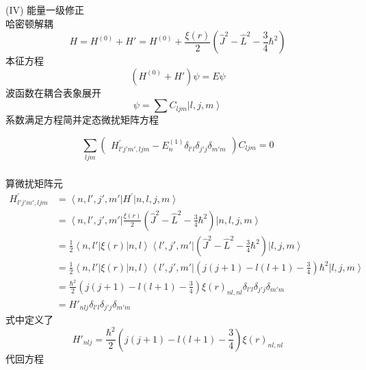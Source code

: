 \begin{frame}[label=current]
  \frametitle{}
  (IV) 能量一级修正 \\
  哈密顿解耦
  $$
  H= H^{(0)} + H' = H^{(0)} + \frac{\xi(r)}{2} (\hat{J}^2 - \hat{L}^2 - \frac{3}{4}\hbar^2)  
  $$ 
  本征方程 
  $$
  (H^{(0)} + H')\psi = E \psi  
  $$ 
  波函数在耦合表象展开
$$
\psi = \sum C_{ljm}\left\vert l, j, m \right \rangle
$$ 
系数满足方程简并定态微扰矩阵方程

  \begin{equation*}
    \sum_{ljm}\begin{pmatrix}H^{\prime}_{l'j'm',ljm} -E^{(1)}_n \delta _{l'l} \delta _{j'j}\delta _{m'm} \end{pmatrix}C_{ljm} =0
  \end{equation*}
\end{frame} 

\begin{frame}[label=current]
  \frametitle{}
算微扰矩阵元
\begin{equation*}
\begin{aligned}
  H^{\prime}_{l'j'm',ljm} &=\left\langle n, l', j', m' \right\vert  H^{\prime}  \left\vert n, l,  j, m \right \rangle \\
  &=\left\langle n, l', j', m' \right\vert  \frac{\xi(r)}{2} (\hat{J}^2 - \hat{L}^2 - \frac{3}{4}\hbar^2)  \left\vert n, l,  j, m \right \rangle \\
  &= \frac{1}{2} \left\langle n, l' \right\vert  \xi(r) \left\vert n, l\right \rangle \left\langle l', j', m' \right\vert  (\hat{J}^2 - \hat{L}^2 - \frac{3}{4}\hbar^2)  \left\vert l,  j, m \right \rangle \\
  &= \frac{1}{2} \left\langle n, l' \right\vert  \xi(r) \left\vert n, l\right \rangle \left\langle l', j', m' \right\vert  (j(j+1) - l(l+1) - \frac{3}{4})\hbar^2  \left\vert l,  j, m \right \rangle \\
  &= \frac{\hbar^2}{2} (j(j+1) - l(l+1) - \frac{3}{4}) \xi(r)_{nl, nl} \delta _{l'l} \delta _{j'j}\delta _{m'm}  \\
  &= H'_{nlj} \delta _{l'l} \delta _{j'j}\delta _{m'm}
\end{aligned}
\end{equation*}
式中定义了$$ H'_{nlj} = \frac{\hbar^2}{2} (j(j+1) - l(l+1) - \frac{3}{4}) \xi(r)_{nl, nl} $$ 
代回方程
\end{frame} 

